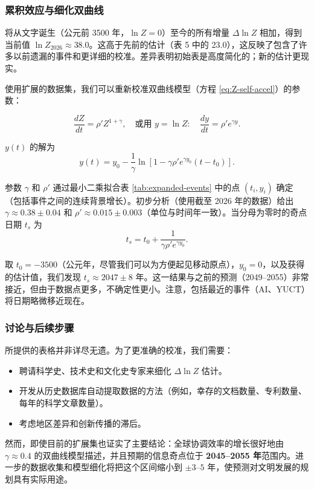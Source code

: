 \documentclass[12pt,a4paper]{article}
\theoremstyle{remark}
\begin{document}
		\subsubsection{累积效应与细化双曲线}
		
		将从文字诞生（公元前 3500 年，$\ln Z=0$）至今的所有增量 $\Delta \ln Z$ 相加，得到当前值 $\ln Z_{2026} \approx 38.0$。这高于先前的估计（表 5 中的 23.0），这反映了包含了许多以前遗漏的事件和更详细的校准。差异表明初始表是高度简化的；新的估计更现实。
		
		使用扩展的数据集，我们可以重新校准双曲线模型（方程 \ref{eq:Z-self-accel}）的参数：
		
		\[
		\frac{dZ}{dt} = \rho' Z^{1+\gamma}, \quad \text{或用 } y = \ln Z: \quad \frac{dy}{dt} = \rho' e^{\gamma y}.
		\]
		
		$y(t)$ 的解为
		\[
		y(t) = y_0 - \frac{1}{\gamma} \ln\left[1 - \gamma \rho' e^{\gamma y_0} (t - t_0)\right].
		\]
		
		参数 $\gamma$ 和 $\rho'$ 通过最小二乘拟合表 \ref{tab:expanded-events} 中的点 $(t_i, y_i)$ 确定（包括事件之间的连续背景增长）。初步分析（使用截至 2026 年的数据）给出 $\gamma \approx 0.38 \pm 0.04$ 和 $\rho' \approx 0.015 \pm 0.003$（单位与时间年一致）。当分母为零时的奇点日期 $t_s$ 为
		\[
		t_s = t_0 + \frac{1}{\gamma \rho' e^{\gamma y_0}}.
		\]
		
		取 $t_0 = -3500$（公元年，尽管我们可以为方便起见移动原点），$y_0 = 0$，以及获得的估计值，我们发现 $t_s \approx 2047 \pm 8$ 年。这一结果与之前的预测（2049–2055）非常接近，但由于数据点更多，不确定性更小。注意，包括最近的事件（AI、YUCT）将日期略微移近现在。
		
		\subsubsection{讨论与后续步骤}
		
		所提供的表格并非详尽无遗。为了更准确的校准，我们需要：
		\begin{itemize}
			\item 聘请科学史、技术史和文化史专家来细化 $\Delta \ln Z$ 估计。
			\item 开发从历史数据库自动提取数据的方法（例如，幸存的文档数量、专利数量、每年的科学文章数量）。
			\item 考虑地区差异和创新传播的滞后。
		\end{itemize}
		然而，即使目前的扩展集也证实了主要结论：全球协调效率的增长很好地由 $\gamma \approx 0.4$ 的双曲线模型描述，并且预期的信息奇点位于 \textbf{2045–2055 年}范围内。进一步的数据收集和模型细化将把这个区间缩小到 $\pm 3$–$5$ 年，使预测对文明发展的规划具有实际用途。
		
\end{document}
